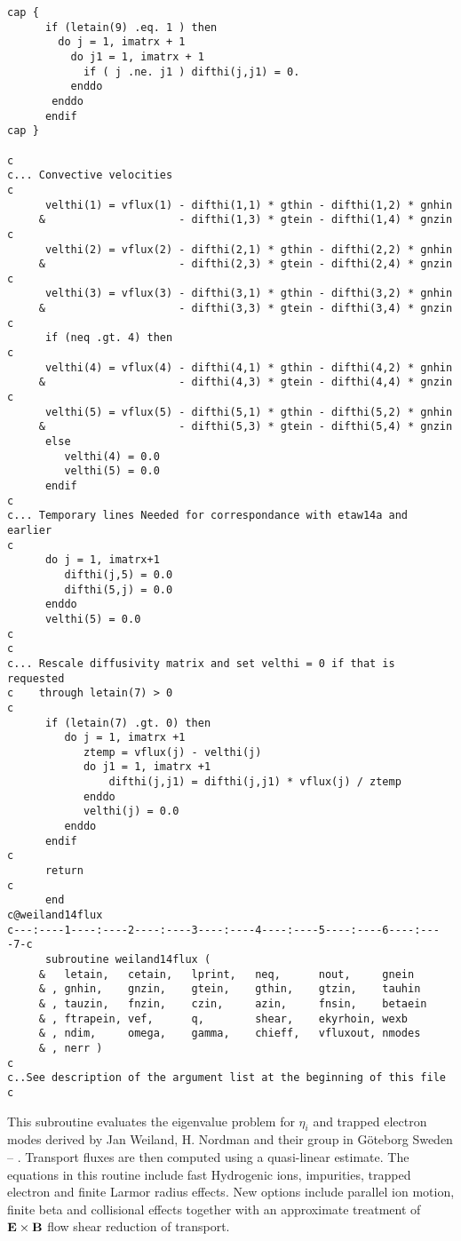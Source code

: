 \begin{verbatim}
cap {
      if (letain(9) .eq. 1 ) then
        do j = 1, imatrx + 1
          do j1 = 1, imatrx + 1
            if ( j .ne. j1 ) difthi(j,j1) = 0.
          enddo  
       enddo
      endif
cap } 

c
c... Convective velocities
c
      velthi(1) = vflux(1) - difthi(1,1) * gthin - difthi(1,2) * gnhin
     &                     - difthi(1,3) * gtein - difthi(1,4) * gnzin
c
      velthi(2) = vflux(2) - difthi(2,1) * gthin - difthi(2,2) * gnhin
     &                     - difthi(2,3) * gtein - difthi(2,4) * gnzin
c
      velthi(3) = vflux(3) - difthi(3,1) * gthin - difthi(3,2) * gnhin
     &                     - difthi(3,3) * gtein - difthi(3,4) * gnzin
c
      if (neq .gt. 4) then 
c
      velthi(4) = vflux(4) - difthi(4,1) * gthin - difthi(4,2) * gnhin
     &                     - difthi(4,3) * gtein - difthi(4,4) * gnzin
c
      velthi(5) = vflux(5) - difthi(5,1) * gthin - difthi(5,2) * gnhin
     &                     - difthi(5,3) * gtein - difthi(5,4) * gnzin
      else
         velthi(4) = 0.0
         velthi(5) = 0.0
      endif
c
c... Temporary lines Needed for correspondance with etaw14a and earlier
c
      do j = 1, imatrx+1
         difthi(j,5) = 0.0
         difthi(5,j) = 0.0
      enddo
      velthi(5) = 0.0
c
c
c... Rescale diffusivity matrix and set velthi = 0 if that is requested
c    through letain(7) > 0
c      
      if (letain(7) .gt. 0) then
         do j = 1, imatrx +1
            ztemp = vflux(j) - velthi(j)
            do j1 = 1, imatrx +1
                difthi(j,j1) = difthi(j,j1) * vflux(j) / ztemp
            enddo
            velthi(j) = 0.0
         enddo
      endif
c
      return
c
      end
c@weiland14flux
c---:----1----:----2----:----3----:----4----:----5----:----6----:----7-c
      subroutine weiland14flux (
     &   letain,   cetain,   lprint,   neq,      nout,     gnein
     & , gnhin,    gnzin,    gtein,    gthin,    gtzin,    tauhin
     & , tauzin,   fnzin,    czin,     azin,     fnsin,    betaein
     & , ftrapein, vef,      q,        shear,    ekyrhoin, wexb
     & , ndim,     omega,    gamma,    chieff,   vfluxout, nmodes
     & , nerr )
c
c..See description of the argument list at the beginning of this file
c
\end{verbatim}

This subroutine evaluates the eigenvalue problem for $\eta_i$
and trapped electron modes derived by 
Jan Weiland, H. Nordman and their group in G\"{o}teborg Sweden
\cite{bate98a} -- \cite{jarm87a}.
Transport fluxes are then computed using a quasi-linear estimate.
The equations in this routine include fast Hydrogenic ions,
impurities, trapped electron and finite Larmor radius effects.
New options include parallel ion motion, finite beta and collisional effects
together with an approximate treatment of ${\bf E}\times {\bf B}$ flow 
shear reduction of transport.


